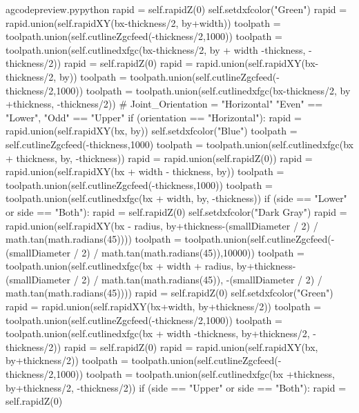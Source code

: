 \documentclass{ltxdoc}
\begin{document}
\begin{writecode}{a}{gcodepreview.py}{python}
                rapid = self.rapidZ(0)
                self.setdxfcolor("Green")
                rapid = rapid.union(self.rapidXY(bx-thickness/2, by+width))
                toolpath = toolpath.union(self.cutlineZgcfeed(-thickness/2,1000))
                toolpath = toolpath.union(self.cutlinedxfgc(bx-thickness/2, by + width -thickness, -thickness/2))
                rapid = self.rapidZ(0)
                rapid = rapid.union(self.rapidXY(bx-thickness/2, by))
                toolpath = toolpath.union(self.cutlineZgcfeed(-thickness/2,1000))
                toolpath = toolpath.union(self.cutlinedxfgc(bx-thickness/2, by +thickness, -thickness/2))
#     Joint_Orientation = "Horizontal" "Even" == "Lower", "Odd" == "Upper"
        if (orientation == "Horizontal"):
            rapid = rapid.union(self.rapidXY(bx, by))
            self.setdxfcolor("Blue")
            toolpath = self.cutlineZgcfeed(-thickness,1000)
            toolpath = toolpath.union(self.cutlinedxfgc(bx + thickness, by, -thickness))
            rapid = rapid.union(self.rapidZ(0))
            rapid = rapid.union(self.rapidXY(bx + width - thickness, by))
            toolpath = toolpath.union(self.cutlineZgcfeed(-thickness,1000))
            toolpath = toolpath.union(self.cutlinedxfgc(bx + width, by, -thickness))
            if (side == "Lower" or side == "Both"):
                rapid = self.rapidZ(0)
                self.setdxfcolor("Dark Gray")
                rapid = rapid.union(self.rapidXY(bx - radius, by+thickness-(smallDiameter / 2) / math.tan(math.radians(45))))
                toolpath = toolpath.union(self.cutlineZgcfeed(-(smallDiameter / 2) / math.tan(math.radians(45)),10000))
                toolpath = toolpath.union(self.cutlinedxfgc(bx + width + radius, by+thickness-(smallDiameter / 2) / math.tan(math.radians(45)), -(smallDiameter / 2) / math.tan(math.radians(45))))
                rapid = self.rapidZ(0)
                self.setdxfcolor("Green")
                rapid = rapid.union(self.rapidXY(bx+width, by+thickness/2))
                toolpath = toolpath.union(self.cutlineZgcfeed(-thickness/2,1000))
                toolpath = toolpath.union(self.cutlinedxfgc(bx + width -thickness, by+thickness/2, -thickness/2))
                rapid = self.rapidZ(0)
                rapid = rapid.union(self.rapidXY(bx, by+thickness/2))
                toolpath = toolpath.union(self.cutlineZgcfeed(-thickness/2,1000))
                toolpath = toolpath.union(self.cutlinedxfgc(bx +thickness, by+thickness/2, -thickness/2))
            if (side == "Upper" or side == "Both"):
                rapid = self.rapidZ(0)

\end{writecode}
\end{document}
